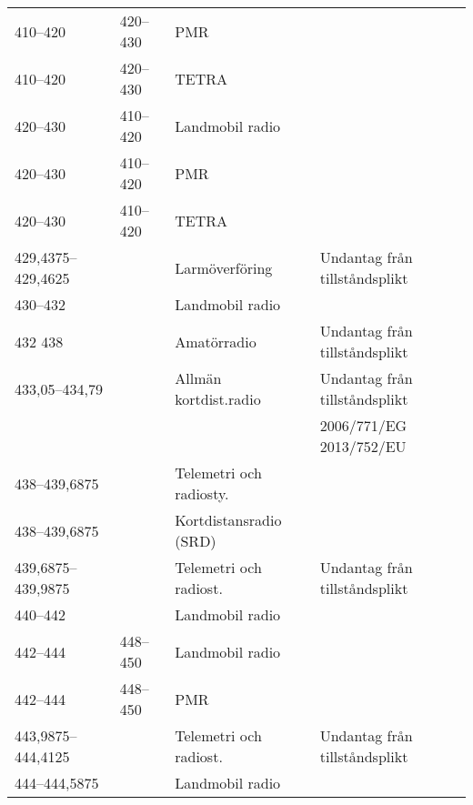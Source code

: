 \begin{landscape}
\begin{landscape}
\begin{longtable}{llll}
	410--420           & 420--430           & PMR                     &                                       \\
	410--420           & 420--430           & TETRA                   &                                       \\
	420--430           & 410--420           & Landmobil radio         &                                       \\
	420--430           & 410--420           & PMR                     &                                       \\
	420--430           & 410--420           & TETRA                   &                                       \\
	429,4375--429,4625 &                    & Larmöverföring          & Undantag från tillståndsplikt         \\
	430--432           &                    & Landmobil radio         &                                       \\
	432	438        &                    & Amatörradio             & Undantag från tillståndsplikt         \\
	433,05--434,79     &                    & Allmän kortdist.radio   & Undantag från tillståndsplikt         \\
	                   &                    &                         & 2006/771/EG 2013/752/EU               \\
	438--439,6875      &                    & Telemetri och radiosty. &                                       \\
	438--439,6875      &                    & Kortdistansradio (SRD)  &                                       \\
	439,6875--439,9875 &                    & Telemetri och radiost.  & Undantag från tillståndsplikt         \\
	440--442           &                    & Landmobil radio         &                                       \\
	442--444           & 448--450           & Landmobil radio         &                                       \\
	442--444           & 448--450           & PMR                     &                                       \\
	443,9875--444,4125 &                    & Telemetri och radiost.  & Undantag från tillståndsplikt         \\
	444--444,5875      &                    & Landmobil radio         &                                       \\

\end{longtable}
\end{landscape}
\end{landscape}

